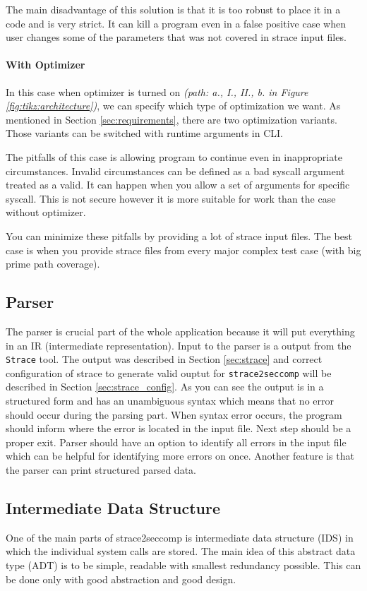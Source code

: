 The main disadvantage of this solution is that it is too robust to place it in a code and is very strict.
It can kill a program even in a false positive case when user changes some of the parameters that was not covered in strace input files.

\paragraph{With Optimizer}
In this case when optimizer is turned on \textit{(path: a., I., II., b. in Figure \ref{fig:tikz:architecture})}, we can specify which type of optimization we want.
As mentioned in Section \ref{sec:requirements}, there are two optimization variants.
Those variants can be switched with runtime arguments in CLI.

The pitfalls of this case is allowing program to continue even in inappropriate circumstances.
Invalid circumstances can be defined as a bad syscall argument treated as a valid.
It can happen when you allow a set of arguments for specific syscall.
This is not secure however it is more suitable for work than the case without optimizer.

You can minimize these pitfalls by providing a lot of strace input files.
The best case is when you provide strace files from every major complex test case (with big prime path coverage).

\subsection{Parser}
The parser is crucial part of the whole application because it will put everything in an IR (intermediate representation).
Input to the parser is a output from the \texttt{Strace} tool.
The output was described in Section \ref{sec:strace} and correct configuration of strace to generate valid ouptut for \texttt{strace2seccomp} will be described in Section \ref{sec:strace_config}.
As you can see the output is in a structured form and has an unambiguous syntax which means that no error should occur during the parsing part.
When syntax error occurs, the program should inform where the error is located in the input file.
Next step should be a proper exit.
Parser should have an option to identify all errors in the input file which can be helpful for identifying more errors on once.
Another feature is that the parser can print structured parsed data.

\subsection{Intermediate Data Structure}
One of the main parts of strace2seccomp is intermediate data structure (IDS) in which the individual system calls are stored.
The main idea of this abstract data type (ADT) is to be simple, readable with smallest redundancy possible.
This can be done only with good abstraction and good design.

